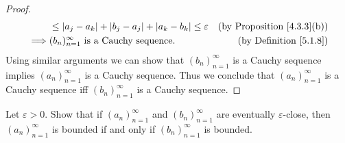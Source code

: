 \begin{proof}
\begin{align*}
                 & \leq \left\lvert a_j - a_k\right\rvert + \left\lvert b_j - a_j\right\rvert + \left\lvert a_k - b_k\right\rvert \leq \varepsilon                & \text{(by Proposition \ref{4.3.3}(b))}    \\
        \implies & (b_n)_{n = 1}^\infty \text{ is a Cauchy sequence}.                                       & \text{(by Definition \ref{5.1.8})}
    \end{align*}
    Using similar arguments we can show that \((b_n)_{n = 1}^\infty\) is a Cauchy sequence implies \((a_n)_{n = 1}^\infty\) is a Cauchy sequence.
    Thus we conclude that \((a_n)_{n = 1}^\infty\) is a Cauchy sequence iff \((b_n)_{n = 1}^\infty\) is a Cauchy sequence.
\end{proof}

\begin{exercise}\label{ex 5.2.2}
    Let \(\varepsilon > 0\).
    Show that if \((a_n)_{n = 1}^{\infty}\) and \((b_n)_{n = 1}^{\infty}\) are eventually \(\varepsilon\)-close, then \((a_n)_{n = 1}^{\infty}\) is bounded if and only if \((b_n)_{n = 1}^{\infty}\) is bounded.
\end{exercise}

